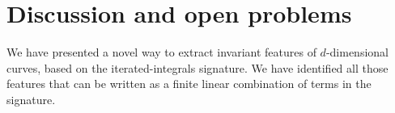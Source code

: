 \documentclass{scrartcl}
\theoremstyle{plain}
\theoremstyle{definition}
\newcommand{\1}[1]{1_{\{#1\}}}
\newcommand{\TODO}[1]{ \textbf{\color{Orange}(TODO #1)} }
\newcommand{\ds}{d} %
\begin{document}
%
%
%
%
%
%
%





\section{Discussion and open problems}
\label{sec:discussion}

We have presented a novel way to extract invariant features of $\ds$-dimensional curves,
based on the iterated-integrals signature.
%
We have identified all those features that can be written as a finite linear combination of terms in the signature.
\end{document}
